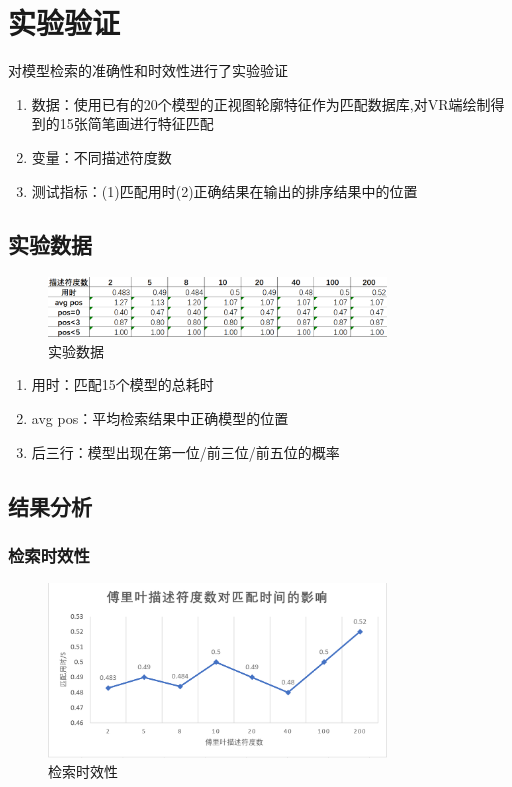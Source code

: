 \documentclass{article}
\begin{document}
\section{实验验证}
对模型检索的准确性和时效性进行了实验验证
\begin{enumerate}
    \item 数据：使用已有的20个模型的正视图轮廓特征作为匹配数据库,对VR端绘制得到的15张简笔画进行特征匹配
    \item 变量：不同描述符度数
    \item 测试指标：(1)匹配用时(2)正确结果在输出的排序结果中的位置
\end{enumerate}
\subsection{实验数据}

\begin{figure}[htb]
    \centering
    \includegraphics[width=0.8\textwidth]{images/data.png}
    \caption{实验数据}\label{fig:digit}
\end{figure} 

\begin{enumerate}
    \item 用时：匹配15个模型的总耗时 \\
    \item avg pos：平均检索结果中正确模型的位置 \\
    \item 后三行：模型出现在第一位/前三位/前五位的概率 \\
\end{enumerate}

\subsection{结果分析}

\subsubsection{检索时效性}

\begin{figure}[htb]
    \centering
    \includegraphics[width=0.8\textwidth]{images/time.png}
    \caption{检索时效性}\label{fig:digit}
\end{figure} 
\end{document}
